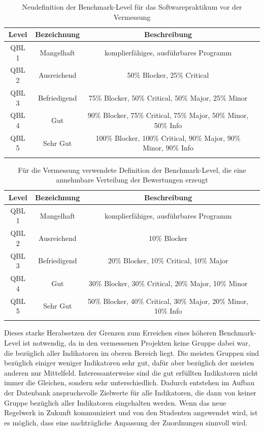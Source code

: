 \documentclass[da,ngerman]{stthesis}
\begin{document}
			\begin{center}
				\tabulinesep=1.5mm
				\begin{longtabu}{|c|c|c|c|}
					\hline
  					\textbf{Level} & \textbf{Bezeichnung} & \textbf{Beschreibung} \\
  					\hline 
					QBL 1 & Mangelhaft & komplierfähiges, ausführbares Programm \\  						\hline
  					QBL 2 & Ausreichend & 50\% Blocker, 25\% Critical \\ 
  					\hline
  					QBL 3 & Befriedigend & 75\% Blocker, 50\% Critical, 50\% Major, 25\% Minor \\
  					\hline
  					QBL 4 & Gut & 90\% Blocker, 75\% Critical, 75\% Major, 50\% Minor, 50\% Info \\
  					\hline
  					QBL 5 & Sehr Gut & 100\% Blocker, 100\% Critical, 90\% Major, 90\% Minor, 90\% Info \\
  					\hline
  					\caption{Neudefinition der Benchmark-Level für das Softwarepraktikum vor der Vermessung}
					\label{indexdef}
  				\end{longtabu}   
  			\end{center}
  			\begin{center}
				\tabulinesep=1.5mm
				\begin{longtabu}{|c|c|c|c|}
					\hline
  					\textbf{Level} & \textbf{Bezeichnung} & \textbf{Beschreibung} \\
  					\hline 
					QBL 1 & Mangelhaft & komplierfähiges, ausführbares Programm \\  						\hline
  					QBL 2 & Ausreichend & 10\% Blocker \\ 
  					\hline
  					QBL 3 & Befriedigend & 20\% Blocker, 10\% Critical, 10\% Major \\
  					\hline
  					QBL 4 & Gut & 30\% Blocker, 30\% Critical, 20\% Major, 10\% Minor \\
  					\hline
  					QBL 5 & Sehr Gut & 50\% Blocker, 40\% Critical, 30\% Major, 20\% Minor, 10\% Info \\
  					\hline
  					\caption{Für die Vermessung verwendete Definition der Benchmark-Level, die eine annehmbare Verteilung der Bewertungen erzeugt}
					\label{indexdefnew}
  				\end{longtabu}   
  			\end{center}
  			Dieses starke Herabsetzen der Grenzen zum Erreichen eines höheren Benchmark-Level ist notwendig, da in den vermessenen Projekten keine Gruppe dabei war, die bezüglich aller Indikatoren im oberen Bereich liegt. Die meisten Gruppen sind bezüglich einiger weniger Indikatoren sehr gut, dafür aber bezüglich der meisten anderen nur Mittelfeld. Interessanterweise sind die gut erfüllten Indikatoren nicht immer die Gleichen, sondern sehr unterschiedlich. Dadurch entstehen im Aufbau der Datenbank anspruchsvolle Zielwerte für alle Indikatoren, die dann von keiner Gruppe bezüglich aller Indikatoren eingehalten werden. Wenn das neue Regelwerk in Zukunft kommuniziert und von den Studenten angewendet wird, ist es möglich, dass eine nachträgliche Anpassung der Zuordnungen sinnvoll wird. \newline
\end{document}
